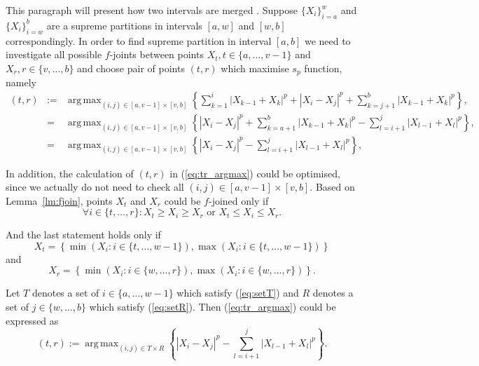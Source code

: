 \documentclass[12pt, a4paper]{article}
\DeclareMathOperator*{\argmax}{arg\,max}
\numberwithin{equation}{section}
\begin{document}
This paragraph will present how two intervals are merged .
Suppose $\{X_{i}\}_{i=a}^{w}$  and $\{X_{i}\}_{i=w}^{b}$
are a supreme partitions in intervals $[a,w]$ and $[w,b]$ correspondingly.  
In order to find supreme partition in interval $[a,b]$
we need to investigate all possible
$f$-joints between points $X_t, t\in \{a,\dots,v-1\}$ and
$X_r, r\in \{v,\dots,b\}$ and choose pair of points
$(t, r)$ which maximise $s_p$ function, namely  
\begin{eqnarray}
  (t, r) &:=& \argmax_{(i,j) \in [a, v-1] \times [v, b] } 
    \left\{ \sum_{k=1}^i |X_{k-1} + X_{k}|^p + |X_i-X_j|^p 
    + \sum_{k=j+1}^b |X_{k-1} + X_{k}|^p \right\}, \nonumber \\
  &=& \argmax_{(i,j) \in [a, v-1] \times [v, b] }  
    \left\{|X_i-X_j|^p +  \sum_{k=a+1}^b |X_{k-1} + X_{k}|^p  
    - \sum_{l=i+1}^j |X_{l-1} + X_{l}|^p  \right\}, \nonumber \\
   \label{eq:tr_argmax}  
   &=& \argmax_{(i,j) \in [a, v-1] \times [v, b] }  
    \left\{|X_i-X_j|^p - \sum_{l=i+1}^j |X_{l-1} + X_{l}|^p  \right\},   
\end{eqnarray}


In addition, the calculation of $(t, r)$ in (\ref{eq:tr_argmax})
could be optimised, since we actually do not need to check
all $(i,j) \in [a, v-1] \times [v, b]$. 
Based on Lemma~\ref{lm:fjoin},
points $X_t$ and $X_r$ could be $f$-joined only if 
\begin{equation}
  \forall i \in \{t,\dots,r\}: X_t \geq X_i \geq X_r \text{ or } 
  X_t \leq X_i \leq X_r.
\end{equation} 
   
And the last statement holds only if 
\begin{equation}\label{eq:setT}
  X_t = \left\{ \min ( X_i : i \in \{t, \dots, w-1\}),
  \max ( X_i : i \in \{t, \dots, w-1\}) \right\}  
\end{equation}
and
\begin{equation}\label{eq:setR}
  X_r = \left\{ \min ( X_i : i \in \{w, \dots, r\}),
  \max (X_i : i \in \{w, \dots, r\}) \right\}.  
\end{equation} 

Let $T$ denotes a set of $i \in \{a,\dots ,w-1\}$ which satisfy 
(\ref{eq:setT}) and $R$ denotes a set of $j \in \{w,\dots ,b\}$ which satisfy (\ref{eq:setR}).
Then (\ref{eq:tr_argmax}) 
could be expressed as
\begin{equation}
  (t, r) :=  
    \argmax_{(i,j) \in T \times R }  
    \left\{|X_i-X_j|^p - \sum_{l=i+1}^j |X_{l-1} + X_{l}|^p  \right\}.   
\end{equation} 
\end{document}
